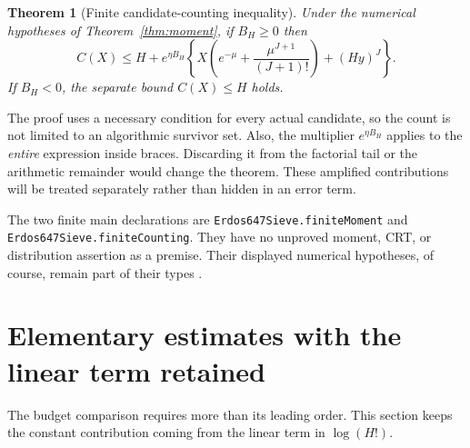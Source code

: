 \documentclass[11pt,a4paper]{article}
\newtheorem{theorem}{Theorem}[section]
\theoremstyle{definition}
\theoremstyle{remark}
\numberwithin{equation}{section}
\newcommand{\leanname}[1]{{\small\nolinkurl{#1}}}
\begin{document}
\begin{theorem}[Finite candidate-counting inequality]\label{thm:finite-count}
Under the numerical hypotheses of Theorem~\ref{thm:moment}, if $B_H\ge0$ then
\begin{equation}\label{eq:finite-count}
 C(X)\le H+e^{\eta B_H}
 \left\{X\left(e^{-\mu}+\frac{\mu^{J+1}}{(J+1)!}\right)+(Hy)^J\right\}.
\end{equation}
If $B_H<0$, the separate bound $C(X)\le H$ holds.
\end{theorem}
The proof uses a necessary condition for every actual candidate, so the count
is not limited to an algorithmic survivor set. Also, the multiplier
$e^{\eta B_H}$ applies to the \emph{entire} expression inside braces.
Discarding it from the factorial tail or the arithmetic remainder would change
the theorem. These amplified contributions will be treated separately rather
than hidden in an error term.

The two finite main declarations are
\leanname{Erdos647Sieve.finiteMoment} and
\leanname{Erdos647Sieve.finiteCounting}. They have no unproved moment, CRT,
or distribution assertion as a premise. Their displayed numerical hypotheses,
of course, remain part of their types \citep{SieveArtifact}.

\section{Elementary estimates with the linear term retained}\label{sec:elementary}
The budget comparison requires more than its leading order. This section keeps
the constant contribution coming from the linear term in $\log(H!)$.
\end{document}
